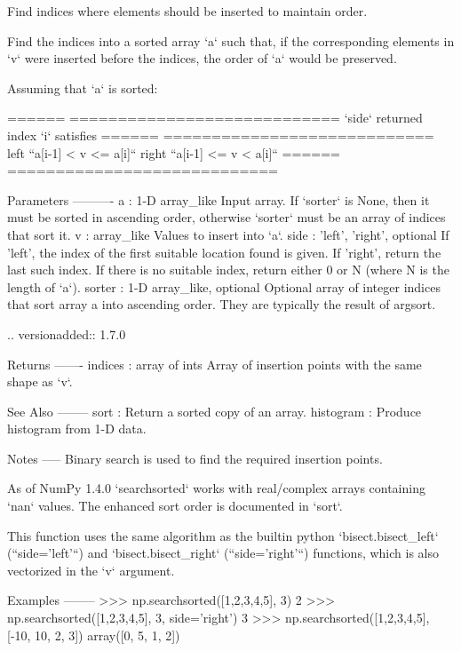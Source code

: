 \begin{DoxyVerb}Find indices where elements should be inserted to maintain order.

Find the indices into a sorted array `a` such that, if the
corresponding elements in `v` were inserted before the indices, the
order of `a` would be preserved.

Assuming that `a` is sorted:

======  ============================
`side`  returned index `i` satisfies
======  ============================
left    ``a[i-1] < v <= a[i]``
right   ``a[i-1] <= v < a[i]``
======  ============================

Parameters
----------
a : 1-D array_like
    Input array. If `sorter` is None, then it must be sorted in
    ascending order, otherwise `sorter` must be an array of indices
    that sort it.
v : array_like
    Values to insert into `a`.
side : {'left', 'right'}, optional
    If 'left', the index of the first suitable location found is given.
    If 'right', return the last such index.  If there is no suitable
    index, return either 0 or N (where N is the length of `a`).
sorter : 1-D array_like, optional
    Optional array of integer indices that sort array a into ascending
    order. They are typically the result of argsort.

    .. versionadded:: 1.7.0

Returns
-------
indices : array of ints
    Array of insertion points with the same shape as `v`.

See Also
--------
sort : Return a sorted copy of an array.
histogram : Produce histogram from 1-D data.

Notes
-----
Binary search is used to find the required insertion points.

As of NumPy 1.4.0 `searchsorted` works with real/complex arrays containing
`nan` values. The enhanced sort order is documented in `sort`.

This function uses the same algorithm as the builtin python `bisect.bisect_left`
(``side='left'``) and `bisect.bisect_right` (``side='right'``) functions,
which is also vectorized in the `v` argument.

Examples
--------
>>> np.searchsorted([1,2,3,4,5], 3)
2
>>> np.searchsorted([1,2,3,4,5], 3, side='right')
3
>>> np.searchsorted([1,2,3,4,5], [-10, 10, 2, 3])
array([0, 5, 1, 2])\end{DoxyVerb}
 \mbox{\label{namespacenumpy_1_1core_1_1fromnumeric_a2129ea44e0f09787c65f8cf599e8fd52}} 
